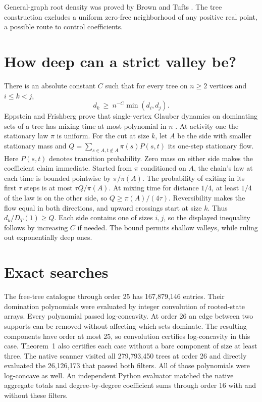 \documentclass[10pt]{article}
\begin{document}
General-graph root density was proved by Brown and Tufts \cite{bt}.
The tree construction excludes a uniform zero-free neighborhood of
any positive real point, a possible route to control coefficients.

\section{How deep can a strict valley be?}

There is an absolute constant \(C\) such that for every tree on
\(n\ge2\) vertices and \(i\le k<j\),
\[
    d_k\ \ge\ n^{-C}\min(d_i,d_j).
\]
Eppstein and Frishberg prove that single-vertex Glauber dynamics on
dominating sets of a tree has mixing time at most polynomial in \(n\)
\cite[Theorem 3]{ef}. At activity one the stationary law \(\pi\) is
uniform. For the cut at size \(k\), let \(A\) be the side with smaller
stationary mass and \(Q=\sum_{s\in A,t\notin A}\pi(s)P(s,t)\) its
one-step stationary flow. Here \(P(s,t)\) denotes transition
probability. Zero mass on either side makes the coefficient claim
immediate. Started from \(\pi\) conditioned on \(A\), the chain's law
at each time is bounded pointwise by \(\pi/\pi(A)\). The probability
of exiting in its first \(\tau\) steps is at most \(\tau Q/\pi(A)\).
At mixing time for distance \(1/4\), at least \(1/4\) of the law is
on the other side, so \(Q\ge\pi(A)/(4\tau)\).
Reversibility makes the flow equal in both directions, and upward
crossings start at size \(k\). Thus \(d_k/D_T(1)\ge Q\).
Each side contains one of sizes \(i,j\), so the displayed
inequality follows by increasing \(C\) if needed. The bound permits
shallow valleys, while ruling out exponentially deep ones.

\section{Exact searches}

The free-tree catalogue through order 25 has 167,879,146 entries.
Their domination polynomials were evaluated by integer convolution
of rooted-state arrays. Every polynomial passed log-concavity.
At order 26 an edge between two supports can be removed without
affecting which sets dominate. The resulting components have order
at most 25, so convolution certifies log-concavity in this case.
Theorem~1 also certifies each case without a bare component of
size at least three. The native scanner visited all 279,793,450
trees at order 26 and directly evaluated the 26,126,173 that passed
both filters. All of those polynomials were log-concave as well.
An independent Python evaluator matched the native aggregate totals
and degree-by-degree coefficient sums through order 16 with and
without these filters.
\end{document}
